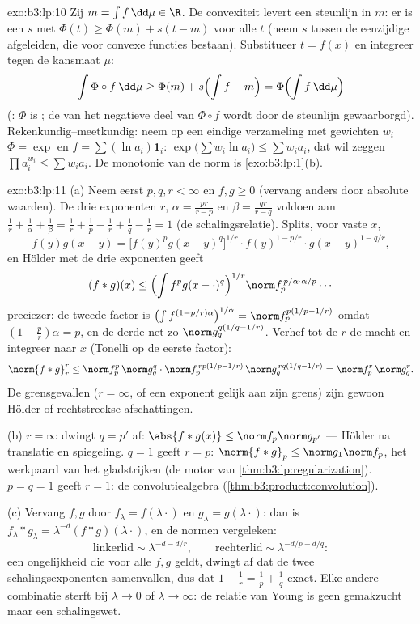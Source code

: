 \begin{solution}{exo:b3:lp:10}
Zij $m = \int f\,\dd\mu \in \R$. De convexiteit levert een
steunlijn in $m$: er is een $s$ met $\Phi(t) \geq \Phi(m) + s(t -
m)$ voor alle $t$ (neem $s$ tussen de eenzijdige afgeleiden, die
voor convexe functies bestaan). Substitueer $t = f(x)$ en
integreer tegen de kansmaat $\mu$:
\[
\int\Phi\circ f\,\dd\mu \geq \Phi(m) + s\Bigl(\int f - m\Bigr)
= \Phi\Bigl(\int f\,\dd\mu\Bigr)
\]
(: $\Phi$ is ; de  van het
negatieve deel van $\Phi\circ f$ wordt door de steunlijn
gewaarborgd). Rekenkundig--meetkundig: neem op een eindige
verzameling met gewichten $w_i$ $\Phi = \exp$ en $f = \sum(\ln
a_i)\mathbf 1_i$: $\exp\bigl(\sum w_i\ln a_i\bigr) \leq \sum
w_ia_i$, dat wil zeggen $\prod a_i^{w_i} \leq \sum w_ia_i$. De
monotonie van de norm is \cref{exo:b3:lp:1}(b).
\end{solution}

\begin{solution}{exo:b3:lp:11}
(a) Neem eerst $p, q, r < \infty$ en $f, g \geq 0$ (vervang
anders door absolute waarden). De drie exponenten $r$, $\alpha =
\frac{pr}{r-p}$ en $\beta = \frac{qr}{r-q}$ voldoen aan $\frac1r
+ \frac1\alpha + \frac1\beta = \frac1r + \frac1p - \frac1r +
\frac1q - \frac1r = 1$ (de schalingsrelatie). Splits, voor vaste
$x$,
\[
f(y)g(x-y) = \bigl[f(y)^pg(x-y)^q\bigr]^{1/r}\cdot
f(y)^{1 - p/r}\cdot g(x-y)^{1 - q/r},
\]
en Hölder met de drie exponenten geeft
\[
(f*g)(x) \leq \Bigl(\int f^pg(x-\cdot)^q\Bigr)^{1/r}
\norm f_p^{\,p/\alpha\cdot\alpha/p}\cdots
\]
preciezer: de tweede factor is $\bigl(\int f^{(1-p/r)\alpha}
\bigr)^{1/\alpha} = \norm f_p^{p(1/p - 1/r)}$ omdat $(1 - \frac
pr)\alpha = p$, en de derde net zo $\norm g_q^{q(1/q - 1/r)}$.
Verhef tot de $r$-de macht en integreer naar $x$ (Tonelli op de
eerste factor):
\[
\norm{f*g}_r^r \leq \norm f_p^p\,\norm g_q^q\cdot
\norm f_p^{\,rp(1/p - 1/r)}\,\norm g_q^{\,rq(1/q - 1/r)}
= \norm f_p^r\,\norm g_q^r .
\]
De grensgevallen ($r = \infty$, of een exponent gelijk aan zijn
grens) zijn gewoon Hölder of rechtstreekse afschattingen.

(b) $r = \infty$ dwingt $q = p'$ af: $\abs{f*g(x)} \leq \norm
f_p\norm g_{p'}$ --- Hölder na translatie en spiegeling. $q = 1$
geeft $r = p$: $\norm{f*g}_p \leq \norm g_1\norm f_p$, het
werkpaard van het gladstrijken (de motor van
\cref{thm:b3:lp:regularization}). $p = q = 1$ geeft $r = 1$: de
convolutiealgebra (\cref{thm:b3:product:convolution}).

(c) Vervang $f, g$ door $f_\lambda = f(\lambda\cdot)$ en
$g_\lambda = g(\lambda\cdot)$: dan is $f_\lambda*g_\lambda =
\lambda^{-d}(f*g)(\lambda\cdot)$, en de normen vergeleken:
\[
\text{linkerlid} \sim \lambda^{-d - d/r}, \qquad
\text{rechterlid} \sim \lambda^{-d/p - d/q} :
\]
een ongelijkheid die voor alle $f, g$ geldt, dwingt af dat de
twee schalingsexponenten samenvallen, dus dat $1 + \frac1r =
\frac1p + \frac1q$ exact. Elke andere combinatie sterft bij
$\lambda \to 0$ of $\lambda \to \infty$: de relatie van Young is
geen gemakzucht maar een schalingswet.
\end{solution}


